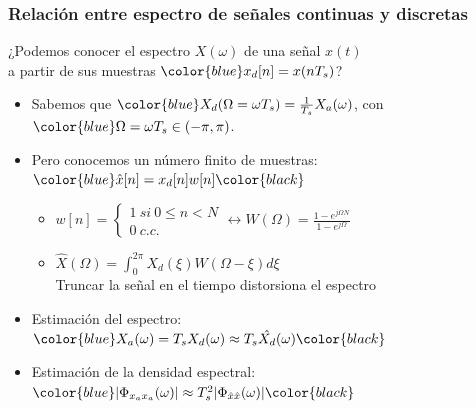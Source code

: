 \documentclass{beamer}
\numberwithin{section}{part}
\begin{document}
\begin{frame} 
  \frametitle{Relación entre espectro de señales continuas y discretas}
    \begin{center}
    \alert{¿Podemos conocer el espectro $X(\omega)$ de una señal $x(t)$\\  
    a partir de sus muestras $\color{blue}x_d[n]=x(nT_s)$?}
    \end{center}
    \begin{itemize}
      \item Sabemos que $\color{blue}X_d(\Omega=\omega T_s)=\frac{1}{T_s}X_a(\omega)$, con $\color{blue}\Omega=\omega T_s\in(-\pi,\pi)$.
      \item Pero conocemos un número finito de muestras: $\color{blue}\hat{x}[n]=x_d[n]w[n]\color{black}$ \vspace{0.2cm}
      \begin{itemize}
        \item $w[n]=\left\{ \begin{matrix}1~si~0\leq n< N\\ 0~c.c.\end{matrix} \right. \leftrightarrow W(\Omega)=\frac{1-e^{j\Omega N}}{1-e^{j\Omega}}$
        \item $\hat{X}(\Omega)=\int_{0}^{2\pi}X_d(\xi)W(\Omega-\xi)d\xi$ \\ \vspace{0.1cm}
        \alert{Truncar la señal en el tiempo distorsiona el espectro}
      \end{itemize} \vspace{0.2cm}  
      \item Estimación del espectro: $\color{blue}X_a(\omega)=T_s X_d(\omega)\approx T_s \hat{X_d}(\omega)\color{black}$ \vspace{0.2cm} 
      \item Estimación de la densidad espectral: $\color{blue}|\Phi_{x_a x_a}(\omega)|\approx T_s^2|\Phi_{\hat{x}\hat{x}}(\omega)|\color{black}$
    \end{itemize}
\end{frame}    
\end{document}
